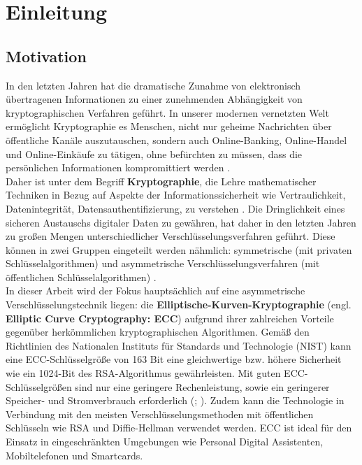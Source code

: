 \chapter{Einleitung}

\section{Motivation}


In den letzten Jahren hat die dramatische Zunahme von elektronisch übertragenen Informationen zu einer zunehmenden Abhängigkeit von kryptographischen Verfahren geführt. 
In unserer modernen vernetzten Welt ermöglicht Kryptographie es Menschen, nicht nur geheime Nachrichten über öffentliche Kanäle auszutauschen, sondern auch Online-Banking, Online-Handel und Online-Einkäufe zu tätigen, ohne befürchten zu müssen, dass die persönlichen Informationen kompromittiert werden \cite{werner}. 
\\
Daher ist unter dem Begriff \textbf{Kryptographie}, die Lehre mathematischer Techniken in Bezug auf Aspekte der Informationssicherheit wie Vertraulichkeit, Datenintegrität, Datensauthentifizierung, zu verstehen \cite{menezes:1997}.
Die Dringlichkeit eines sicheren Austauschs digitaler Daten zu gewähren, hat daher in den letzten Jahren zu großen Mengen unterschiedlicher Verschlüsselungsverfahren geführt.
Diese können in zwei Gruppen eingeteilt werden nähmlich: symmetrische (mit privaten Schlüsselalgorithmen) und asymmetrische Verschlüsselungsverfahren (mit öffentlichen Schlüsselalgorithmen) \cite{menezes:1997}. 
\\

In dieser Arbeit wird der Fokus hauptsächlich auf eine asymmetrische Verschlüsselungstechnik liegen: die \textbf{Elliptische-Kurven-Kryptographie} (engl. \textbf{Elliptic Curve Cryptography: ECC}) aufgrund ihrer zahlreichen Vorteile gegenüber herkömmlichen kryptographischen Algorithmen.
Gemäß den Richtlinien des Nationalen Instituts für Standards und Technologie (NIST) kann eine ECC-Schlüsselgröße von 163 Bit eine gleichwertige bzw. höhere Sicherheit wie ein 1024-Bit des RSA-Algorithmus gewährleisten. Mit guten ECC-Schlüsselgrößen sind nur eine geringere Rechenleistung, sowie ein geringerer Speicher- und Stromverbrauch erforderlich (\cite{edoh}; \cite{sosax}). Zudem kann die Technologie in Verbindung mit den meisten Verschlüsselungsmethoden mit öffentlichen Schlüsseln wie RSA und Diffie-Hellman verwendet werden.
ECC ist ideal für den Einsatz in eingeschränkten Umgebungen wie Personal Digital Assistenten, Mobiltelefonen und Smartcards. 
\\

